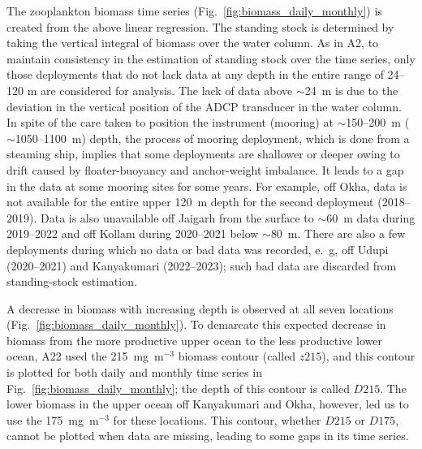 \documentclass[authoryear,review,11pt]{elsarticle}
\begin{document}
The zooplankton biomass time series (Fig.~\ref{fig:biomass_daily_monthly}) is created from the above linear regression. The standing stock is determined by taking the vertical integral of biomass over the water column. As in A2, to maintain consistency in the estimation of standing stock over the time series, only those deployments that do not lack data at any depth in the entire range of 24--120 m are considered for analysis. The lack of data above $\sim$24~m is due to the deviation in the vertical position of the ADCP transducer in the water column. In spite of the care taken to position the instrument (mooring) at  $\sim$150--200~m ($\sim$1050--1100~m) depth, the process of mooring deployment, which is done from a steaming ship, implies that some deployments are shallower or deeper owing to drift caused by floater-buoyancy and anchor-weight imbalance. It leads to a gap in the data at some mooring sites for some years. For example, off Okha, data is not available for the entire upper 120~m depth for the second deployment (2018--2019). Data is also unavailable off Jaigarh from the surface to $\sim$60~m data during 2019--2022 and off Kollam during 2020--2021 below $\sim$80~m. There are also a few deployments during which no data or bad data was recorded, e.~g, off Udupi (2020--2021) and Kanyakumari (2022--2023); such bad data are discarded from standing-stock estimation. 	

A decrease in biomass with increasing depth is observed at all seven locations (Fig.~\ref{fig:biomass_daily_monthly}).  To demarcate this expected decrease in biomass from the more productive upper ocean to the less productive lower ocean, A22 used the 215~mg~m$^{-3}$ biomass contour (called $z215$), and this contour is plotted for both daily and monthly time series in Fig.~\ref{fig:biomass_daily_monthly}; the depth of this contour is called $D215$.  The lower biomass in the upper ocean off Kanyakumari and Okha, however, led us to use the 175~mg~m$^{-3}$ for these locations.  This contour, whether $D215$ or $D175$, cannot be plotted when data are missing, leading to some gaps in its time series.  


\end{document}
